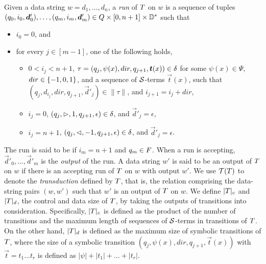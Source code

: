 Given a data string $w = d_1, \dots, d_n$, a \emph{run} of $T$ on $w$
is a sequence of tuples $(q_0, i_0, \vec{d}'_0), \ldots, (q_m, i_m, \vec{d}'_m) \in \controls \times [0, n+1] \times \data^*$ 
such that
\begin{itemize}
    \item $i_0 = 0$, and
    \item for every $j \in [m-1]$, one of the following holds,
    \begin{itemize}
  	\item  $0< i_j < n+1$, $\tau=(q_j, \psi(x), dir, q_{j+1}, \vec{t}(x)) \in \transrel$ for some $\psi(x) \in \Psi$, $dir \in \{-1, 0, 1\}$, and a sequence of  $\mathcal{S}$-terms $\vec{t}(x)$, such that $(q_j, d_{i_j}, dir, q_{j+1}, \vec{d}'_j) \in \|\tau\|$, and $i_{j+1} = i_j + dir$,
	\item $i_j = 0$, $(q_j, \vartriangleright, 1, q_{j+1}, \epsilon) \in \delta$, and $\vec{d}'_j  = \epsilon$,
	\item $i_j = n+1$, $(q_j, \vartriangleleft, -1, q_{j+1}, \epsilon) \in \delta$, and $\vec{d}'_j  = \epsilon$.
  \end{itemize}
\end{itemize}
The run is said to be  if $i_m = n+1$ and $q_m \in F$. When a run is accepting, $\vec{d}'_0, \ldots, \vec{d}'_m$ is the \emph{output} of the run.
A data string $w'$ is said to be an output of $T$ on $w$ if there is an accepting run of
$T$ on $w$ with output $w'$. We use $\mathcal{T}(T)$ to denote the \emph{transduction} defined by $T$, that is, the relation comprising the data-string pairs $(w, w')$ such that $w'$ is an output of $T$ on $w$.
%
We define $|T|_c$ and $|T|_d$, the control and data size of $T$, by taking the outputs of transitions into consideration. Specifically, $|T|_c$ is defined as the product of the number of transitions and the maximum length of sequences of $\mathcal{S}$-terms in  transitions of $T$. 
On the other hand, $|T|_d$ is defined as the maximum size of symbolic transitions of $T$, where the size of a symbolic transition $(q_j, \psi(x), dir, q_{j+1}, \vec{t}(x))$ with $\vec{t}=t_1 \ldots t_r$ is defined as $|\psi| + |t_1| + \ldots + |t_r|$.


